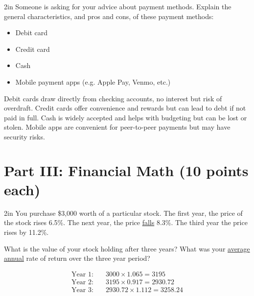 \documentclass[12pt]{exam}
\begin{document}
\begin{questions}
  \begin{shortanswer}[10]{2in}
    Someone is asking for your advice about payment methods.  Explain the general characteristics, and pros
    and cons, of these payment methods:
    \begin{itemize}
      \item Debit card
      \item Credit card
      \item Cash
      \item Mobile payment apps (e.g. Apple Pay, Venmo, etc.)
    \end{itemize}
  \end{shortanswer}
  \begin{solution}
    Debit cards draw directly from checking accounts, no interest but risk of overdraft. Credit
    cards offer convenience and rewards but can lead to debt if not paid in full. Cash is widely
    accepted and helps with budgeting but can be lost or stolen. Mobile apps are convenient for
    peer-to-peer payments but may have security risks.
  \end{solution}

  \section*{Part III: Financial Math (10 points each)}

  \begin{problem}[10]{2in}
    You purchase \$3,000 worth of a particular stock.  The first year, the price of the
    stock rises 6.5\%.  The next year, the price \underline{falls} 8.3\%.  The third year the price
    rises by 11.2\%.

    What is the value of your stock holding after three years? What was
    your \underline{average annual} rate of return over the three year period?
  \end{problem}
  \begin{solution}
    \begin{align*}
      \text{Year 1:} \quad & 3000 \times 1.065 = 3195 \\
      \text{Year 2:} \quad & 3195 \times 0.917 = 2930.72 \\
      \text{Year 3:} \quad & 2930.72 \times 1.112 = 3258.24
    \end{align*}

    \vspace{0.5\baselineskip}


\end{solution}
\end{questions}
\end{document}
